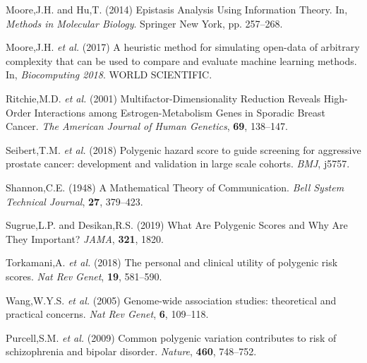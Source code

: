 \documentclass{ws-procs11x85}
\begin{document}
\leavevmode\hypertarget{ref-1FFMLUZxb}{}%
Moore,J.H. and Hu,T. (2014) Epistasis Analysis Using Information Theory.
In, \emph{Methods in Molecular Biology}. Springer New York, pp.
257--268.

\leavevmode\hypertarget{ref-pDXdtMFa}{}%
Moore,J.H. \emph{et al.} (2017) A heuristic method for simulating
open-data of arbitrary complexity that can be used to compare and
evaluate machine learning methods. In, \emph{Biocomputing 2018}. WORLD
SCIENTIFIC.

\leavevmode\hypertarget{ref-E26QhGxD}{}%
Ritchie,M.D. \emph{et al.} (2001) Multifactor-Dimensionality Reduction
Reveals High-Order Interactions among Estrogen-Metabolism Genes in
Sporadic Breast Cancer. \emph{The American Journal of Human Genetics},
\textbf{69}, 138--147.

\leavevmode\hypertarget{ref-gkABDVTx}{}%
Seibert,T.M. \emph{et al.} (2018) Polygenic hazard score to guide
screening for aggressive prostate cancer: development and validation in
large scale cohorts. \emph{BMJ}, j5757.

\leavevmode\hypertarget{ref-yzGboP1g}{}%
Shannon,C.E. (1948) A Mathematical Theory of Communication. \emph{Bell
System Technical Journal}, \textbf{27}, 379--423.

\leavevmode\hypertarget{ref-1Dlv3tAGh}{}%
Sugrue,L.P. and Desikan,R.S. (2019) What Are Polygenic Scores and Why
Are They Important? \emph{JAMA}, \textbf{321}, 1820.

\leavevmode\hypertarget{ref-1GK3F1BxE}{}%
Torkamani,A. \emph{et al.} (2018) The personal and clinical utility of
polygenic risk scores. \emph{Nat Rev Genet}, \textbf{19}, 581--590.

\leavevmode\hypertarget{ref-12kQ0EOWQ}{}%
Wang,W.Y.S. \emph{et al.} (2005) Genome-wide association studies:
theoretical and practical concerns. \emph{Nat Rev Genet}, \textbf{6},
109--118.

\leavevmode\hypertarget{ref-mwTa2RUK}{}%
Purcell,S.M. \emph{et al.} (2009) Common polygenic variation contributes to risk of schizophrenia
and bipolar disorder. \emph{Nature}, \textbf{460}, 748--752.
\end{document}

